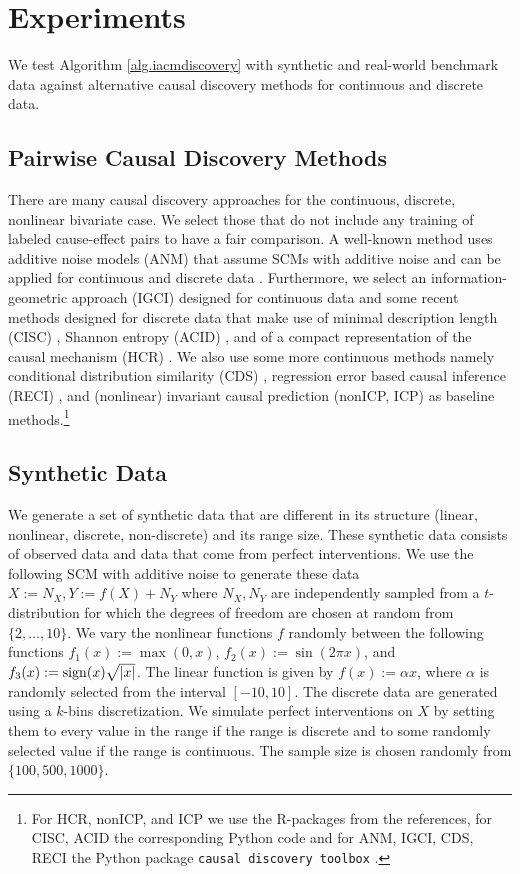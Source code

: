 \documentclass[letterpaper]{article}
\newcommand{\code}[1]{\texttt{#1}}
\begin{document}
\section{Experiments} \label{sec.experiments}

We test Algorithm \ref{alg.iacmdiscovery} with synthetic and real-world benchmark data against alternative causal discovery methods for continuous and discrete data. 

\subsection{Pairwise Causal Discovery Methods}

There are many causal discovery approaches for the continuous, discrete, nonlinear bivariate case. We select those that do not include any training of labeled cause-effect pairs to have a fair comparison. A well-known method uses additive noise models (ANM) that assume SCMs with additive noise and can be applied for continuous and discrete data \cite{HJMPS09, PJS11}. Furthermore, we select an information-geometric approach (IGCI) \cite{JMZLZDSS12} designed for continuous data and some recent methods designed for discrete data that make use of minimal description length (CISC) \cite{BV17}, Shannon entropy (ACID) \cite{BV18}, and of a compact representation of the causal mechanism (HCR) \cite{CQZZH18}. We also use some more continuous methods namely conditional distribution similarity (CDS) \cite{F16}, regression error based causal inference (RECI) \cite{BJWSS18}, and (nonlinear) invariant causal prediction (nonICP, ICP) \cite{HPM18, PBM16} as baseline methods.\footnote{For HCR, nonICP, and ICP we use the R-packages from the references, for CISC, ACID the corresponding Python code and for ANM, IGCI, CDS, RECI the Python package \code{causal discovery toolbox} \cite{KG19}.}


\subsection{Synthetic Data}

We generate a set of synthetic data that are different in its structure (linear, nonlinear, discrete, non-discrete) and its range size. These synthetic data consists of observed data and data that come from perfect interventions. We use the following SCM with additive noise to generate these data $X:= N_X, Y:= f(X) + N_Y$ where $N_X, N_Y$ are independently sampled from a $t$-distribution for which the degrees of freedom are chosen at random from $\{2,\ldots, 10\}$. We vary the nonlinear functions $f$ randomly between the following functions $f_1 (x) := \max(0,x)$, $f_2(x):=\sin(2\pi x)$, and $f_3(x):={\rm sign}(x)\sqrt{|x|}$. The linear function is given by $f(x) := \alpha x$, where $\alpha$ is randomly selected from the interval $[-10, 10]$. The discrete data are generated using a $k$-bins discretization. We simulate perfect interventions on $X$ by setting them to every value in the range if the range is discrete and to some randomly selected value if the range is continuous. The sample size is chosen randomly from $\{100,500,1000\}$.
\end{document}
